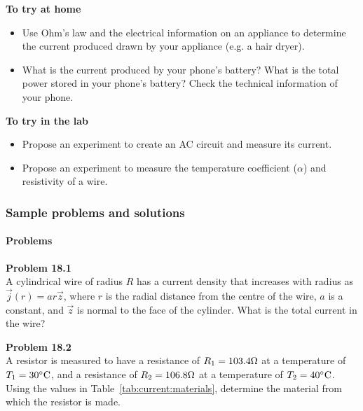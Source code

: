 \begin{framed}
\textbf{To try at home}\\
\begin{itemize}
\item Use Ohm's law and the electrical information on an appliance to determine the current produced drawn by your appliance (e.g. a hair dryer).
\item What is the current produced by your phone's battery? What is the total power stored in your phone's battery? Check the technical information of your phone.
\end{itemize}
\end{framed}

\begin{framed}
\textbf{To try in the lab}\\
\begin{itemize}
\item Propose an experiment to create an AC circuit and measure its current.
\item Propose an experiment to measure the temperature coefficient ($\alpha$) and resistivity of a wire.
\end{itemize}
\end{framed}

\subsubsection{Sample problems and solutions}

\paragraph{Problems}

\begin{framed}
\textbf{Problem 18.1}\\
A cylindrical wire of radius $R$ has a current density that increases with radius as $\vec j(r) = ar \vec z$, where $r$ is the radial distance from the centre of the wire, $a$ is a constant, and $\vec z$ is normal to the face of the cylinder. What is the total current in the wire?
\end{framed}

\begin{framed}
\textbf{Problem 18.2}\\
A resistor is measured to have a resistance of $R_1=103.4 {\rm \Omega}$ at a temperature of $T_1=30 {\rm \degree C}$, and a resistance of $R_2=106.8 {\rm \Omega}$ at a temperature of $T_2=40 {\rm \degree C}$. Using the values in Table~\ref{tab:current:materials}, determine the material from which the resistor is made.
\end{framed}


